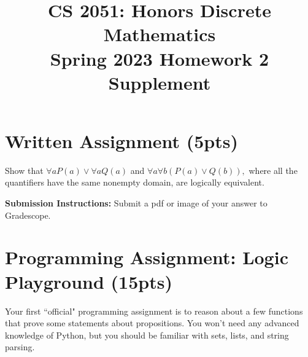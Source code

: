 \documentclass{article}
\title{\vspace{-1cm}CS 2051: Honors Discrete Mathematics \\Spring 2023 Homework 2 Supplement\vspace{-1cm}}
\author{}
\date{}
\begin{document}
\maketitle

{\hypersetup{linkbordercolor=black}
\tableofcontents
}

\pagebreak

\section*{Written Assignment (5pts)}
    Show that $\forall a P(a) \lor \forall a Q(a)$ and $\forall a \forall b (P(a) \lor Q(b)),$ where all the quantifiers have the same nonempty domain, are logically equivalent.

    \vspace{3mm}
    \textbf{Submission Instructions:} 
    Submit a pdf or image of your answer to Gradescope.

\pagebreak

\section*{Programming Assignment: Logic Playground (15pts)}
    Your first ``official" programming assignment is to reason about a few functions that prove some statements about propositions. You won't need any advanced knowledge of Python, but you should be familiar with sets, lists, and string parsing.
\end{document}
